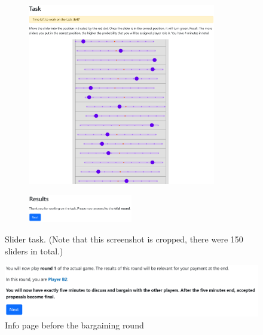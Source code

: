 \begin{figure}[!htb]
   \begin{subfigure}[b]{\textwidth}
        \centering
        \includegraphics[width=0.9\textwidth]{screenshots/slider.pdf}
    \end{subfigure}
    \par\bigskip
    \begin{subfigure}[b]{\textwidth}
        \centering
        \includegraphics[width=0.5\textwidth]{screenshots/slider_results.pdf}
    \end{subfigure}
    \caption{Slider task. (Note that this screenshot is cropped, there were 150 sliders in total.)}
\end{figure}

\begin{figure}[!htb]
    \centering
    \includegraphics[width=.9\linewidth]{screenshots/info.pdf}
    \caption{Info page before the bargaining round}
\end{figure}

